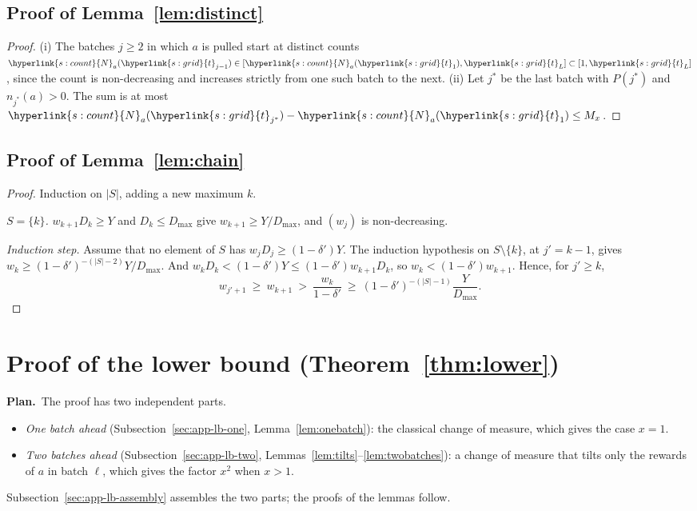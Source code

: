 \documentclass[10pt]{article}
\newcommand{\sy}[2]{{\hyperlink{#1}{#2}}}
\newcommand{\1}{\mathbf{1}}
\newcommand{\Ng}{\sy{s:count}{N}}
\newcommand{\tl}{\sy{s:grid}{t}}
\newcommand{\Plan}{\par\smallskip\noindent\textbf{Plan.}\ }
\begin{document}
\subsection{Proof of Lemma~\ref{lem:distinct}}\label{sec:pf-lem:distinct}
\begin{proof}
(i) The batches $j\ge2$ in which $a$ is pulled start at distinct counts $\Ng_a(\tl_{j-1})\in[\Ng_a(\tl_1),\tl_L]\subset[1,\tl_L]$, since the count is
non-decreasing and increases strictly from one such batch to the next. (ii) Let
$j^\ast$ be the last batch with $P(j^\ast)$ and $n_{j^\ast}(a)>0$. The sum is at most $\Ng_a(\tl_{j^\ast})-\Ng_a(\tl_1)\le M_x$.
\end{proof}

\subsection{Proof of Lemma~\ref{lem:chain}}\label{sec:pf-lem:chain}
\begin{proof}
Induction on $|S|$, adding a new maximum $k$.

\noindent\emph{$S=\{k\}$.} $w_{k+1}D_k\ge Y$ and $D_k\le D_{\max}$ give $w_{k+1}\ge Y/D_{\max}$, and $(w_j)$ is non-decreasing.

\noindent\emph{Induction step.} Assume that no element of $S$ has $w_jD_j\ge(1-\delta')Y$. The induction hypothesis on $S\setminus\{k\}$, at $j'=k-1$, gives
$w_k\ge(1-\delta')^{-(|S|-2)}Y/D_{\max}$. And $w_kD_k<(1-\delta')Y\le(1-\delta')w_{k+1}D_k$, so $w_k<(1-\delta')w_{k+1}$. Hence, for $j'\ge k$,
\[
w_{j'+1}\ \ge\ w_{k+1}\ >\ \frac{w_k}{1-\delta'}\ \ge\ (1-\delta')^{-(|S|-1)}\frac Y{D_{\max}} .
\]
\end{proof}

\section{Proof of the lower bound (Theorem~\ref{thm:lower})}\label{sec:app-lower}

\Plan The proof has two independent parts.
\begin{itemize}
\item \emph{One batch ahead} (Subsection~\ref{sec:app-lb-one}, Lemma~\ref{lem:onebatch}): the classical change of measure, which gives the case $x=1$.
\item \emph{Two batches ahead} (Subsection~\ref{sec:app-lb-two}, Lemmas~\ref{lem:tilts}--\ref{lem:twobatches}): a change of measure that tilts only the rewards of $a$ in
batch $\ell$, which gives the factor $x^2$ when $x>1$.
\end{itemize}
Subsection~\ref{sec:app-lb-assembly} assembles the two parts; the proofs of the lemmas follow.
\end{document}
